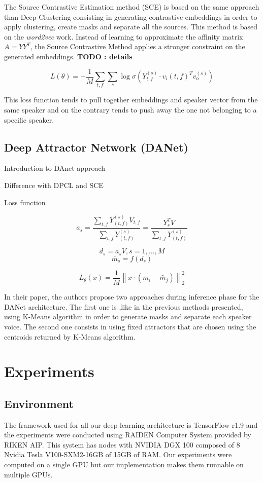 \documentclass[master,final,11pt]{iscs-thesis}
\newcommand{\norm}[1]{\left\lVert#1\right\rVert}
\begin{document}
The Source Contrastive Estimation method (SCE) \cite{SCE} is based on the same approach than Deep Clustering consisting in generating contrastive embeddings in order to apply clustering, create masks and separate all the sources. This method is based on the \textit{word2vec} work.
Instead of learning to approximate the affinity matrix $A = YY^{T}$, the Source Contrastive Method applies a stronger constraint on the generated embeddings. \textbf{TODO : details}

\[L(\theta) = - \frac{1}{M} \sum_{t,f} \sum_{s} \log \sigma(Y_{t,f}^{(s)} \cdot v_i(t,f)^{T} v_o^{(s)})\]

This loss function tends to pull together embeddings and speaker vector from the same speaker and on the contrary tends to push away the one not belonging to a specific speaker.


\section{Deep Attractor Network (DANet)}


Introduction to DAnet approach

Difference with DPCL and SCE

Loss function

\[a_s = \frac{\sum_{t,f}{Y_{(t,f)}^{(s)}V_{t,f} }}{\sum_{t,f}{Y_{(t,f)}^{(s)}}} = \frac{{Y_s^TV}}{\sum_{t,f}{Y_{(t,f)}^{(s)}}}\]

\[d_s = a_sV, s = 1,..., M \]
\[\tilde{m_s} = f(d_s)\]

\[L_\theta(x) = \frac{1}{M} \norm{x \cdot (m_i - \tilde{m_j})}^2_2 \]

In their paper, the authors propose two approaches during inference phase for the DANet architecture. The first one is ,like in the previous methods presented, using K-Means algorithm in order to generate masks and separate each speaker voice. The second one consists in using fixed attractors that are chosen using the centroids returned by K-Means algorithm.

\chapter{Experiments}

\section{Environment}

The framework used for all our deep learning architecture is TensorFlow r1.9 \cite{TF} and the experiments were conducted using RAIDEN Computer System provided by RIKEN AIP. This system has nodes with NVIDIA DGX 100 composed of 8 Nvidia Tesla V100-SXM2-16GB of 15GB of RAM. Our experiments were computed on a single GPU but our implementation makes them runnable on multiple GPUs. 
\end{document}
